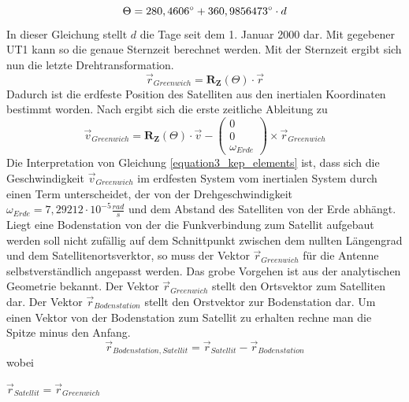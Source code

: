 \begin{equation}
	\Theta = 280,4606\degree+360,9856473\degree\cdot d
\end{equation} 
In dieser Gleichung stellt \ensuremath{d} die Tage seit dem 1. Januar 2000 dar. Mit gegebener UT1 kann so die genaue Sternzeit berechnet werden. Mit der Sternzeit ergibt sich nun die letzte Drehtransformation. 
\begin{equation}
	\vec{r}_{Greenwich}=\mathbf{R_Z}(\Theta) \cdot \vec{r}
\end{equation} 
Dadurch ist die erdfeste Position des Satelliten aus den inertialen Koordinaten bestimmt worden. Nach \cite{HandRaum} ergibt sich die erste zeitliche Ableitung zu
\begin{equation}
	\vec{v}_{Greenwich}=\mathbf{R_Z}(\Theta)\cdot\vec{v}-\left(\begin{array}{c}0\\0\\\omega_{Erde}\end{array}\right)\times\vec{r}_{Greenwich}
	\label{equation3_kep_elements}
\end{equation}   
Die Interpretation von Gleichung \ref{equation3_kep_elements} ist, dass sich die Geschwindigkeit \ensuremath{\vec{v}_{Greenwich}} im erdfesten System vom inertialen System durch einen Term unterscheidet, der von der Drehgeschwindigkeit \ensuremath{\omega_{Erde}=7,29212\cdot 10^{-5}\frac{rad}{s}} und dem Abstand des Satelliten von der Erde abhängt. 
\newpar
Liegt eine Bodenstation von der die Funkverbindung zum Satellit aufgebaut werden soll nicht zufällig auf dem Schnittpunkt zwischen dem nullten Längengrad und dem Satellitenortsverktor, so muss der Vektor \ensuremath{\vec{r}_{Greenwich}} für die Antenne selbstverständlich angepasst werden. Das grobe Vorgehen ist aus der analytischen Geometrie bekannt. Der Vektor \ensuremath{\vec{r}_{Greenwich}} stellt den Ortsvektor zum Satelliten dar. Der Vektor \ensuremath{\vec{r}_{Bodenstation}} stellt den Orstvektor zur Bodenstation dar. Um einen Vektor von der Bodenstation zum Satellit zu erhalten rechne man die Spitze minus den Anfang.
\begin{equation}
	\vec{r}_{Bodenstation,Satellit}=\vec{r}_{Satellit}-\vec{r}_{Bodenstation}
\end{equation} 
wobei 
\begin{center}
	\begin{math}
		\vec{r}_{Satellit}=\vec{r}_{Greenwich}
	\end{math}
\end{center}

